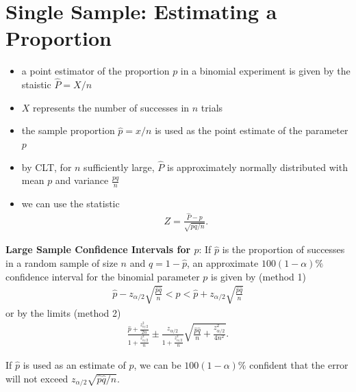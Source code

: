 \documentclass[10pt]{article}
\begin{document}
\section{Single Sample: Estimating a Proportion}
\begin{itemize}
    \item a point estimator of the proportion $p$ in a binomial experiment is given by the staistic $\hat{P} = X / n$ 
    \item $X$ represents the number of successes in $n$ trials
    \item the sample proportion $\hat{p} = x / n$ is used as the point estimate of the parameter $p$
    \item by CLT, for $n$ sufficiently large, $\hat{P}$ is approximately normally distributed with mean $p$ and variance $\frac{pq}{n}$ 
    \item we can use the statistic
        \begin{gather*}
            Z=\frac{\hat{P}-p}{\sqrt{pq / n}}
        .\end{gather*}
\end{itemize}
\begin{theorem}
    \textbf{Large Sample Confidence Intervals for $p$}: If $\hat{p}$ is the proportion of successes in a random sample of size $n$ and $\hat{q} = 1- \hat{p}$, an approximate $100(1-\alpha)\%$ confidence interval for the binomial parameter $p$ is given by (method 1)
    \begin{gather*}
        \hat{p} - z_{\alpha / 2}\sqrt{\frac{\hat{p}\hat{q}}{n}} < p < \hat{p} + z_{\alpha / 2}\sqrt{\frac{\hat{p}\hat{q}}{n}}
    \end{gather*}
    or by the limits (method 2)
    \begin{gather*}
        \frac{\hat{p} + \frac{z_{\alpha / 2}^2}{2n}}{1 + \frac{z_{\alpha / 2}^2}{n}} \pm \frac{z_{\alpha / 2}}{1 + \frac{z_{\alpha / 2}^2}{n}} \sqrt{\frac{\hat{p}\hat{q}}{n} + \frac{z_{\alpha / 2}^2}{4n^2}}
    .\end{gather*}
\end{theorem}
\begin{theorem}
    If $\hat{p}$ is used as an estimate of $p$, we can be $100(1-\alpha)\%$ confident that the error will not exceed $z_{\alpha / 2}\sqrt{\hat{p}\hat{q} / n} $.
\end{theorem}
\end{document}

